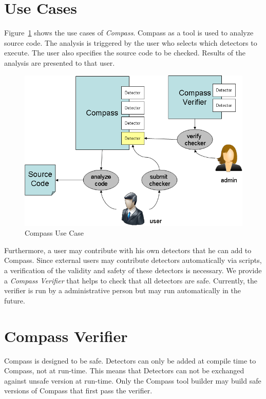\section{Use Cases}

\label{design::UseCase}

Figure~\ref{Compass_usecase} shows the use cases of \emph{Compass}.
Compass as a tool is used to analyze source code. The analysis is triggered by the user who
selects which detectors to execute. The user also specifies the source code to be checked.
Results of the analysis are presented to that user.

\begin{figure}[th]
\includegraphics[width=4.5in]{compass_pic.png}
\caption{Compass Use Case}
\label{Compass_usecase}
\end{figure}

Furthermore, a user may contribute with his own detectors that he can add to Compass. Since 
external users may contribute detectors automatically via scripts, a verification of the 
validity and safety of these detectors is necessary. We provide a \emph{Compass Verifier}
that helps to check that all detectors are safe. Currently, the verifier is run by
a administrative person but may run automatically in the future.


\section{Compass Verifier}

Compass is designed to be safe. Detectors can only be added at compile time to Compass, not at run-time.
This means that Detectors can not be exchanged against unsafe version at run-time. Only 
the Compass tool builder may build safe versions of Compass that first pass the verifier.

